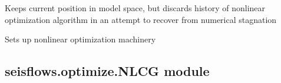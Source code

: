 \documentclass[letterpaper,10pt,english]{sphinxmanual}
\begin{document}
\begin{fulllineitems}
\begin{fulllineitems}
Keeps current position in model space, but discards history of
nonlinear optimization algorithm in an attempt to recover from
numerical stagnation

\end{fulllineitems}


\begin{fulllineitems}
\label{\detokenize{ref/seisflows.optimize:seisflows.optimize.LBFGS.LBFGS.setup}}
Sets up nonlinear optimization machinery

\end{fulllineitems}


\end{fulllineitems}



\subsection{seisflows.optimize.NLCG module}
\label{\detokenize{ref/seisflows.optimize:module-seisflows.optimize.NLCG}}\label{\detokenize{ref/seisflows.optimize:seisflows-optimize-nlcg-module}}
\end{document}
